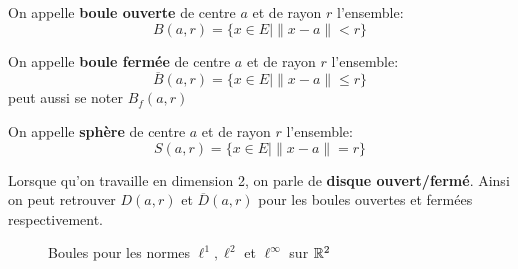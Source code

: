 \documentclass[a4paper, 12pt]{article}
\begin{document}
\vspace{5mm}

\begin{definition}
    On appelle \textbf{boule ouverte} de centre $a$ et de rayon $r$ l'ensemble:
    $$
    B(a, r) = \{x \in E \mid \|x - a\| \lt r\}
    $$
\end{definition}
\begin{definition}
    On appelle \textbf{boule fermée} de centre $a$ et de rayon $r$ l'ensemble:
    $$
    \overline{B}(a, r) = \{x \in E \mid \|x - a\| \leq r\}
    $$
    peut aussi se noter $B_f(a, r)$
\end{definition}
\begin{definition}[(Sphère)]
    On appelle \textbf{sphère} de centre $a$ et de rayon $r$ l'ensemble:
    $$
    S(a, r) = \{x \in E \mid \|x - a\| = r\}
    $$
\end{definition}

\begin{remarque}
    Lorsque qu'on travaille en dimension 2, on parle de \textbf{disque ouvert/fermé}.
    Ainsi on peut retrouver $D(a, r)$ et $\overline{D}(a, r)$ pour les boules ouvertes et fermées respectivement.
\end{remarque}

\begin{figure}[h]
    \centering
    \caption{Boules pour les normes $\ell^1, \ell^2$ et $\ell^\infty$ sur $\mathbb{R}^2$}
    \label{fig:boules}
\end{figure}
\end{document}
